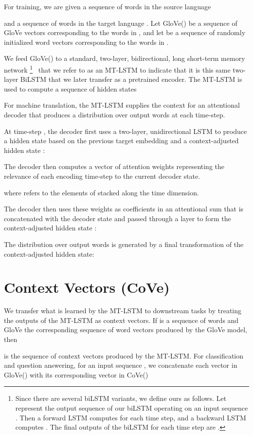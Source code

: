 \documentclass{article}
\begin{document}
For training, 
we are given a sequence of words in the source language 
 
and a sequence of words in the target language
. 
Let GloVe()
be a sequence of GloVe vectors corresponding to the words in ,
and let  be a sequence of randomly initialized word vectors corresponding to the words in .

We feed GloVe() to a standard, two-layer, bidirectional, long short-term memory network
\footnote{
Since there are several biLSTM variants, we define ours as follows. Let  represent the output sequence of our biLSTM operating on an input sequence . Then a forward LSTM computes  
for each time step, and a backward LSTM computes 
.
The final outputs of the biLSTM for each time step are 
.
}~\citep{graves2005framewise} 
that we refer to as an MT-LSTM 
to indicate that it is this same two-layer BiLSTM that we later transfer as a pretrained encoder.
The MT-LSTM  is used to compute a sequence of hidden states


For machine translation, 
the MT-LSTM supplies the context for an attentional decoder 
that produces a distribution over output words 
 at each time-step.

At time-step , 
the decoder first uses a two-layer, 
unidirectional LSTM to produce a hidden state  
based on the previous target embedding  
and a context-adjusted hidden state :


The decoder then computes a vector of attention weights  
representing the relevance of each encoding time-step to the current decoder state.


where  refers to the elements of  stacked along the time dimension.

The decoder then uses these weights as coefficients in an attentional sum
that is concatenated with the decoder state 
and passed through a  layer
to form the context-adjusted hidden state :


The distribution over output words is generated by a final transformation of the context-adjusted hidden state:
 \section{Context Vectors (CoVe)}

We transfer what is learned by the MT-LSTM to downstream tasks by treating the outputs of the MT-LSTM as context vectors. 
If  is a sequence of words and GloVe the corresponding sequence of word vectors produced by the GloVe model,
then

is the sequence of context vectors produced by the MT-LSTM. 
For classification and question answering, 
for an input sequence , 
we concatenate each vector in GloVe() with its corresponding vector in CoVe()
\end{document}
